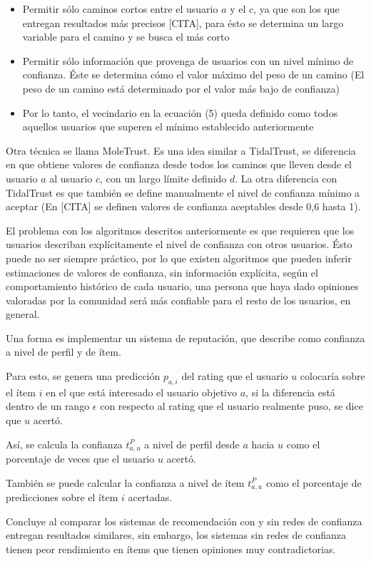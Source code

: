 \begin{itemize}
\item{Permitir sólo caminos cortos entre el usuario $a$ y el $c$, ya que son los que entregan resultados más precisos [CITA], para ésto se determina un largo variable para el camino y se busca el más corto}
\item{Permitir sólo información que provenga de usuarios con un nivel mínimo de confianza. Éste se determina cómo el valor máximo del peso de un camino (El peso de un camino está determinado por el valor más bajo de confianza)} 
\item{Por lo tanto, el vecindario en la ecuación (5) queda definido como todos aquellos usuarios que superen el mínimo establecido anteriormente}
\end{itemize}

Otra técnica se llama MoleTrust. Es una idea similar a TidalTrust, se diferencia en que obtiene valores de confianza desde todos los caminos que lleven desde el usuario $a$ al usuario $c$, con un largo límite definido $d$. La otra diferencia con TidalTrust es que también se define manualmente el nivel de confianza mínimo a aceptar (En [CITA] se definen valores de confianza aceptables desde 0,6 hasta 1).

El problema con los algoritmos descritos anteriormente es que requieren que los usuarios describan explícitamente el nivel de confianza con otros usuarios. Ésto puede no ser siempre práctico, por lo que existen algoritmos que pueden inferir estimaciones de valores de confianza, sin información explícita, según el comportamiento histórico de cada usuario, una persona que haya dado opiniones valoradas por la comunidad será más confiable para el resto de los usuarios, en general.

Una forma es implementar un sistema de reputación, que \cite{Victor} describe como confianza a nivel de perfil y de ítem. 

Para esto, se genera una predicción $p_{a,i}$ del rating que el usuario  $u$ colocaría sobre el ítem $i$ en el que está interesado el usuario objetivo $a$, si la diferencia está dentro de un rango $\epsilon$ con respecto al rating que el usuario realmente puso, se dice que $u$ acertó.

Así, se calcula la confianza $t^P_{a,u}$ a nivel de perfil desde $a$ hacia $u$ como el porcentaje de veces que el usuario $u$ acertó.

También se puede calcular la confianza a nivel de ítem $t^P_{a,u}$ como el porcentaje de predicciones sobre el ítem $i$ acertadas.

\cite{Victor} Concluye al comparar los sistemas de recomendación con y sin redes de confianza entregan resultados similares, sin embargo, los sistemas sin redes de confianza tienen peor rendimiento en ítems que tienen opiniones muy contradictorias.